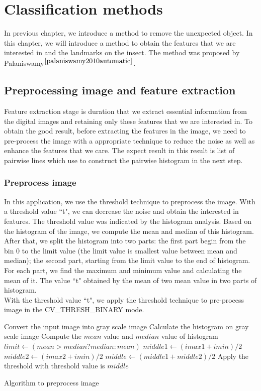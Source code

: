 \chapter{Classification methods }
In previous chapter, we introduce a method to remove the unexpected object. In this chapter, we will introduce a method to obtain the features that we are interested in and the landmarks on the insect. The method was proposed by Palaniswamy$^{\cite{palaniswamy2010automatic}}$.
\section{Preprocessing image and feature extraction}
Feature extraction stage is duration that we extract essential information from the digital images and retaining only these features that we are interested in. To obtain the good result, before extracting the features in the image, we need to pre-process the image with a appropriate technique to reduce the noise as well as enhance the features that we care. The expect result in this result is list of pairwise lines which use to construct the pairwise histogram in the next step.
\subsection{Preprocess image}
In this application, we use the threshold technique to preprocess the image. With a threshold value ``t", we can decrease the noise and obtain the interested in features. The threshold value was indicated by the histogram analysis. Based on the histogram of the image, we compute the mean and median of this histogram. After that, we split the histogram into two parts: the first part begin from the bin 0 to the limit value (the limit value is smallest value between mean and median); the second part, starting from the limit value to the end of histogram. For each part, we find the maximum and minimum value and calculating the mean of it. The value ``t" obtained by the mean of two mean value in two parts of histogram.\\
With the threshold value ``t", we apply the threshold technique to pre-process image in the CV\_THRESH\_BINARY mode.\\
\IncMargin{1em}
\begin{algorithm}[H]
\Indm 
{}
\Indp
Convert the input image into gray scale image\;
Calculate the histogram on gray scale image\;
Compute the $mean$ value and $median$ value of histogram\;
$limit \leftarrow (mean > median ? median: mean)$\;
$middle1 \leftarrow (imax1 + imin)/2$ \;
$middle2 \leftarrow (imax2 + imin)/2$ \;
$middle \leftarrow (middle1 + middle2)/2$ \;
Apply the threshold with threshold value is $middle$\;
\caption{Algorithm to preprocess image}
\end{algorithm}\DecMargin{1em}
